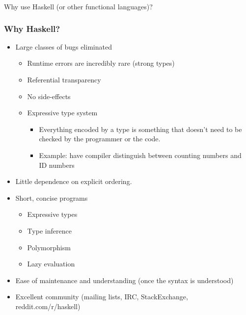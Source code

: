 \begin{frame}
  Why use Haskell (or other functional languages)?
\end{frame}

\begin{frame}
  \frametitle{Why Haskell?}
  \begin{itemize}[<+->]
    \item Large classes of bugs eliminated
      \begin{itemize}[<+->]
        \item Runtime errors are incredibly rare (strong types)
        \item Referential transparency
        \item No side-effects
        \item Expressive type system 
          \begin{itemize}[<+->]
            \item Everything encoded by a type is something that doesn't need to be
                  checked by the programmer or the code.
            \item Example: have compiler distinguish between counting numbers and ID numbers
          \end{itemize}
      \end{itemize}
    \item Little dependence on explicit ordering.
    \item Short, concise programs
      \begin{itemize}[<+->]
        \item Expressive types
        \item Type inference
        \item Polymorphism
        \item Lazy evaluation %
      \end{itemize}
    \item Ease of maintenance and understanding (once the syntax is understood)
    \item Excellent community (mailing lists, IRC, StackExchange, reddit.com/r/haskell)
  \end{itemize}
\end{frame}
